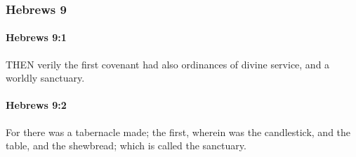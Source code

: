 	\subsubsection{Hebrews 9} %
		\label{HEBREWS-9}
		
		\paragraph{Hebrews 9:1} %
			\label{HEBREWS-9-1}

			THEN verily the first covenant had also ordinances of divine service, and a worldly sanctuary.

			\begin{framed}
			\scriptsize
				\begin{compactdesc}
					\item[SBLG] 
				\end{compactdesc}
			\end{framed}

		\paragraph{Hebrews 9:2} %
			\label{HEBREWS-9-2}

			For there was a tabernacle made; the first, wherein was the candlestick, and the table, and the shewbread; which is called the sanctuary.

